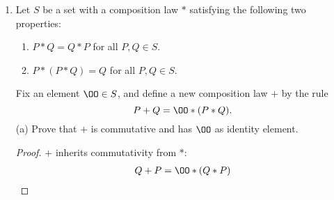 \documentclass[11pt, oneside]{article}
\begin{document}
\begin{enumerate}
\begin{proof}
$$
\lambda_1F(x,y) +\lambda_2G(x,y) = 0
$$
for suitable $\lambda_1$ and $\lambda_2$. Since $F(x,y)$ and $G(x,y)$ both vanish at the ninth point, so does $\lambda_1F(x,y) +\lambda_2G(x,y)$. Therefore, the cubic in question goes through all nine points, including $(0,0)$.
\end{proof}
\setcounter{enumi}{10}
\item Let $S$ be a set with a composition law $*$ satisfying the following two properties:
\begin{enumerate}[label=(\roman*)]
\item \quad $P*Q=Q*P$ for all $P, Q\in S$.
\item \quad $P*(P*Q) = Q$ for all $P,Q\in S$. 
\end{enumerate}
Fix an element $\OO\in S$, and define a new composition law $+$ by the rule
$$
P+Q = \OO *(P*Q).
$$ 
(a) Prove that $+$ is commutative and has $\OO$ as identity element.
\begin{proof}
$+$ inherits commutativity from $*$:
\begin{align*}
Q + P 	&= \OO * (Q * P)\\

\end{align*}
\end{proof}
\end{enumerate}
\end{document}

